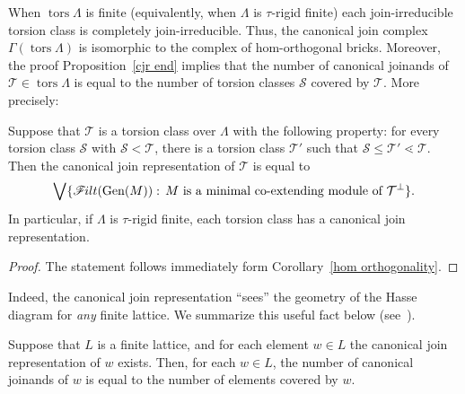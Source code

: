 \documentclass[ALCO,ThmDefs,Unicode,epreuves]{cedram}
\DeclareMathOperator{\tors}{tors}
\newcommand{\calS}{\mathcal{S}}
\newcommand{\calT}{\mathcal{T}}
\newcommand{\filt}{\mathscr{F}\Mk ilt}
\renewcommand{\Join}{\bigvee}
\newcommand{\Gen}{\operatorname{Gen}}
\renewcommand{\1}{\hat{1}}
\newcommand{\0}{\hat{0}}
\newcommand*{\Mk}{\mkern -2mu}
\begin{document}
\begin{remark}\label{finite case}
\normalfont
When $\tors \Lambda$ is finite (equivalently, when $\Lambda$ is $\tau$-rigid finite) each join-irreducible torsion class is completely join-irreducible.
Thus, the canonical join complex $\Gamma(\tors \Lambda)$ is isomorphic to the complex of hom-orthogonal bricks.
Moreover, the proof Proposition~\ref{cjr end} implies that the number of canonical joinands of $\calT\in \tors \Lambda$ is equal to the number of torsion classes $\calS$ covered by $\calT$.
More precisely:

\begin{corollary}\label{cor: torsion labeling}
Suppose that $\calT$ is a torsion class over $\Lambda$ with the
following property: for every torsion class $\calS$ with
$\calS<\calT$, there is a torsion class $\calT'$ such that $\calS \leq
\calT' \lessdot \calT$. 
Then the canonical join representation of $\calT$ is equal to \[\Join \{\filt(\Gen(M)):\,\text{$M$ is a minimal co-extending module of $\calT^\perp$}\}.\]
In particular, if $\Lambda$ is $\tau$-rigid finite, each torsion class has a canonical join representation.
\end{corollary}
\begin{proof}
The statement follows immediately form Corollary~\ref{hom orthogonality}.
\end{proof}

Indeed, the canonical join representation ``sees'' the geometry of the Hasse diagram for \emph{any} finite lattice.
We summarize this useful fact below (see~\cite[Proposition~2.2]{flag}).
\begin{proposition}\label{prop: labeling}
Suppose that $L$ is a finite lattice, and for each element $w\in L$ the canonical join representation of $w$ exists.
Then, for each $w\in L$, the number of canonical joinands of $w$ is equal to the number of elements covered by $w$.
\end{proposition}

\end{remark}
\end{document}
